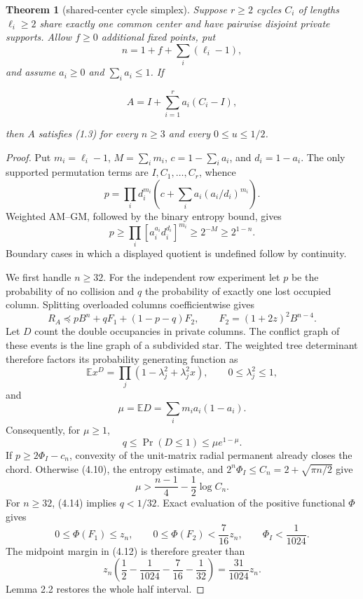 \documentclass[11pt]{article}
\newtheorem{theorem}{Theorem}[section]
\begin{document}
\Needspace{0.18\textheight}
\begin{theorem}[shared-center cycle simplex]

Suppose $r\ge2$ cycles $C_i$ of lengths $\ell_i\ge2$ share
exactly one common center and have pairwise disjoint private supports.  Allow
$f\ge0$ additional fixed points, put
\[
n=1+f+\sum_i(\ell_i-1),
\]
and assume $a_i\ge0$ and $\sum_i a_i\le1$.  If

\[
A=I+\sum_{i=1}^r a_i(C_i-I),
\]

then $A$ satisfies (1.3) for every $n\ge3$ and every
$0\le u\le1/2$.

\end{theorem}

\begin{proof}


Put $m_i=\ell_i-1$, $M=\sum_i m_i$, $c=1-\sum_i a_i$, and
$d_i=1-a_i$.  The only supported permutation terms are
$I,C_1,\ldots,C_r$, whence
\[
p=\prod_i d_i^{m_i}
\left(c+\sum_i a_i(a_i/d_i)^{m_i}\right). \tag{4.10}
\]
Weighted AM--GM, followed by the binary entropy bound, gives
\[
p\ge\prod_i[a_i^{a_i}d_i^{d_i}]^{m_i}\ge2^{-M}\ge2^{1-n}. \tag{4.11}
\]
Boundary cases in which a displayed quotient is undefined follow by continuity.

We first handle $n\ge32$.  For the independent row experiment let
$p$ be the probability of no collision and $q$ the probability of exactly
one lost occupied column.  Splitting overloaded columns coefficientwise gives
\[
R_A\preceq pB^n+qF_1+(1-p-q)F_2,\qquad
F_2=(1+2z)^2B^{n-4}. \tag{4.12}
\]
Let $D$ count the double occupancies in private columns.  The conflict graph
of these events is the line graph of a subdivided star.  The weighted tree
determinant therefore factors its probability generating function as
\[
\mathbb Ex^D=\prod_j(1-\lambda_j^2+\lambda_j^2x),\qquad
0\le\lambda_j^2\le1,
\]
and
\[
\mu=\mathbb ED=\sum_i m_i a_i(1-a_i). \tag{4.13}
\]
Consequently, for $\mu\ge1$,
\[
q\le\Pr(D\le1)\le\mu e^{1-\mu}. \tag{4.14}
\]
If $p\ge2\Phi_I-c_n$, convexity of the unit-matrix radial permanent
already closes the chord.  Otherwise (4.10), the entropy estimate, and
$2^n\Phi_I\le C_n=2+\sqrt{\pi n/2}$ give
\[
\mu>\frac{n-1}{4}-\frac12\log C_n.
\]
For $n\ge32$, (4.14) implies $q<1/32$.  Exact evaluation of the
positive functional $\Phi$ gives
\[
0\le\Phi(F_1)\le z_n,\qquad
0\le\Phi(F_2)<\frac7{16}z_n,\qquad
\Phi_I<\frac1{1024}.
\]
The midpoint margin in (4.12) is therefore greater than
\[
z_n\left(\frac12-\frac1{1024}-\frac7{16}-\frac1{32}\right)
=\frac{31}{1024}z_n.
\]
Lemma 2.2 restores the whole half interval.


\end{proof}
\end{document}
